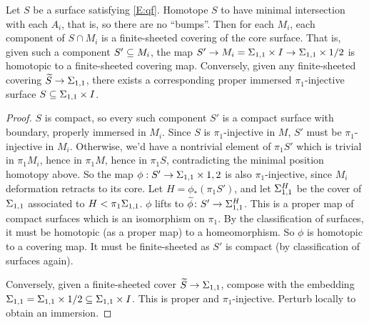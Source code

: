 \begin{lemma}\label{L:sc}

Let $S$ be a surface satisfying \eqref{E:qf}. Homotope $S$ to have minimal
intersection with each $A_i$, that is, so there are no ``bumps''.  Then for
each $M_i$, each component of $S \cap M_i$ is a finite-sheeted covering of the
core surface.  That is, given such a component $S' \subseteq M_i$, the map $S' \to
M_i = \Sigma_{1,1}\times I \to \Sigma_{1,1}\times{1/2}$ is homotopic to a finite-sheeted
covering map. Conversely, given any finite-sheeted covering $\widetilde{S} \to
\Sigma_{1,1}$, there exists a corresponding proper immersed $\pi_1$-injective
surface $S \subseteq \Sigma_{1,1}\times I$.

\end{lemma}
\begin{proof}

$S$ is compact, so every such component $S'$ is a compact surface with
boundary, properly immersed in $M_i$. Since $S$ is $\pi_1$-injective in $M$,
$S'$ must be $\pi_1$-injective in $M_i$. Otherwise, we'd have a nontrivial
element of $\pi_1S'$ which is trivial in $\pi_1M_i$, hence in $\pi_1M$, hence
in $\pi_1S$, contradicting the minimal position homotopy above. So the map
$\phi : S'\to\Sigma_{1,1}\times{1,2}$ is also $\pi_1$-injective, since $M_i$
deformation retracts to its core. Let $H = \phi_*(\pi_1S')$, and let
$\Sigma_{1,1}^H$ be the cover of $\Sigma_{1,1}$ associated to $H<\pi_1\Sigma_{1,1}$.
$\phi$ lifts to $\widetilde{\phi}\colon S'\to \Sigma_{1,1}^H$. This is a proper
map of compact surfaces which is an isomorphism on $\pi_1$.  By the
classification of surfaces, it must be homotopic (as a proper map) to
a homeomorphism. So $\phi$ is homotopic to a covering map. It must be
finite-sheeted as $S'$ is compact (by classification of surfaces again).

Conversely, given a finite-sheeted cover $\widetilde{S}\to \Sigma_{1,1}$, compose
with the embedding $\Sigma_{1,1} = \Sigma_{1,1}\times{1/2} \subseteq \Sigma_{1,1}\times I$. This is
proper and $\pi_1$-injective.  Perturb locally to obtain an immersion.

\end{proof}

